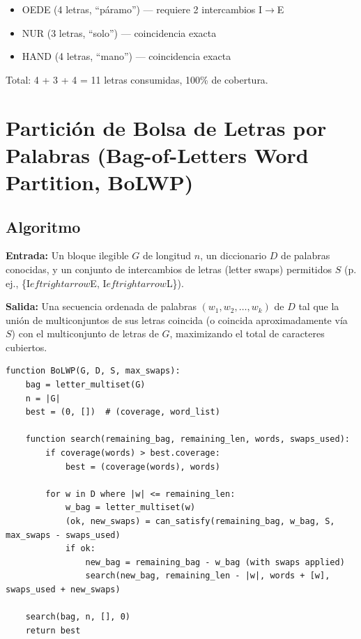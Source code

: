 \documentclass[11pt,a4paper]{article}
\begin{document}
\begin{itemize}
\item OEDE (4 letras, ``páramo'') --- requiere 2 intercambios I$\rightarrow$E
\item NUR (3 letras, ``solo'') --- coincidencia exacta
\item HAND (4 letras, ``mano'') --- coincidencia exacta
\end{itemize}

Total: 4 + 3 + 4 = 11 letras consumidas, 100\% de cobertura.

\section{Partición de Bolsa de Letras por Palabras (Bag-of-Letters Word Partition, BoLWP)}

\subsection{Algoritmo}

\textbf{Entrada:} Un bloque ilegible $G$ de longitud $n$, un diccionario $D$ de palabras conocidas, y un conjunto de intercambios de letras (letter swaps) permitidos $S$ (p. ej., \{I$eftrightarrow$E, I$eftrightarrow$L\}).

\textbf{Salida:} Una secuencia ordenada de palabras $(w_1, w_2, \ldots, w_k)$ de $D$ tal que la unión de multiconjuntos de sus letras coincida (o coincida aproximadamente vía $S$) con el multiconjunto de letras de $G$, maximizando el total de caracteres cubiertos.

\begin{lstlisting}[style=plain]
function BoLWP(G, D, S, max_swaps):
    bag = letter_multiset(G)
    n = |G|
    best = (0, [])  # (coverage, word_list)

    function search(remaining_bag, remaining_len, words, swaps_used):
        if coverage(words) > best.coverage:
            best = (coverage(words), words)

        for w in D where |w| <= remaining_len:
            w_bag = letter_multiset(w)
            (ok, new_swaps) = can_satisfy(remaining_bag, w_bag, S, max_swaps - swaps_used)
            if ok:
                new_bag = remaining_bag - w_bag (with swaps applied)
                search(new_bag, remaining_len - |w|, words + [w], swaps_used + new_swaps)

    search(bag, n, [], 0)
    return best
\end{lstlisting}
\end{document}
